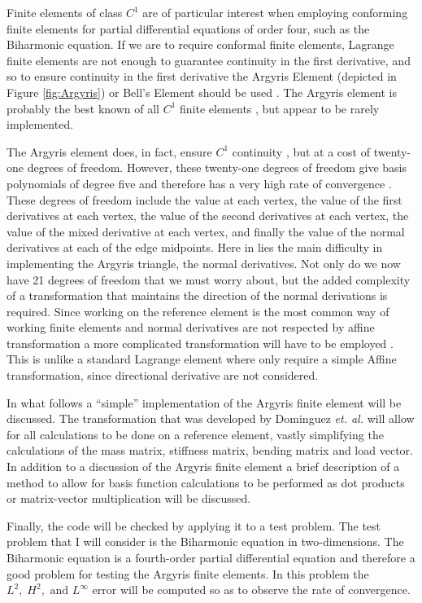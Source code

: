 Finite elements of class $C^1$ are of particular interest when employing
conforming finite elements for partial differential equations of order four, such
as the Biharmonic equation. If we are to require conformal finite elements,
Lagrange finite elements are not enough to guarantee continuity in the first
derivative, and so to ensure continuity in the first derivative the Argyris
Element (depicted in Figure \ref{fig:Argyris}) or Bell's Element should
be used \cite{Johnson}. The Argyris element is probably the best known of all
$C^1$ finite elements \cite{Argyris,DominguezA}, but appear to be rarely
implemented.



The Argyris element does, in fact, ensure $C^1$ continuity
\cite{DominguezA,Okabe}, but at a cost of twenty-one degrees of freedom.
However, these twenty-one degrees of freedom give basis polynomials of degree
five and therefore has a very high rate of convergence \cite{DominguezA}. These
degrees of freedom include the value at each vertex, the value of the first
derivatives at each vertex, the value of the second derivatives at each vertex,
the value of the mixed derivative at each vertex, and finally the value of the
normal derivatives at each of the edge midpoints. Here in lies the main
difficulty in implementing the Argyris triangle, the normal derivatives. Not
only do we now have 21 degrees of freedom that we must worry about, but the
added complexity of a transformation that maintains the direction of the normal
derivations is required. Since working on the reference element is the most
common way of working finite elements and normal derivatives are not respected
by affine transformation a more complicated transformation will have to be
employed \cite{DominguezA}. This is unlike a standard Lagrange element where
only require a simple Affine transformation, since directional derivative are
not considered.

In what follows a ``simple'' implementation of the Argyris finite element will
be discussed. The transformation that was developed by Dominguez \emph{et. al.}
will allow for all calculations to be done on a reference element, vastly
simplifying the calculations of the mass matrix, stiffness matrix, bending
matrix and load vector. In addition to a discussion of the Argyris finite
element a brief description of a method to allow for basis function calculations
to be performed as dot products or matrix-vector multiplication will be
discussed.

Finally, the code will be checked by applying it to a test problem. The test
problem that I will consider is the Biharmonic equation in two-dimensions. The
Biharmonic equation is a fourth-order partial differential equation and
therefore a good problem for testing the Argyris finite elements. In this
problem the $L^2,\; H^2,\text{ and } L^{\infty}$ error will be computed so as to
observe the rate of convergence.
